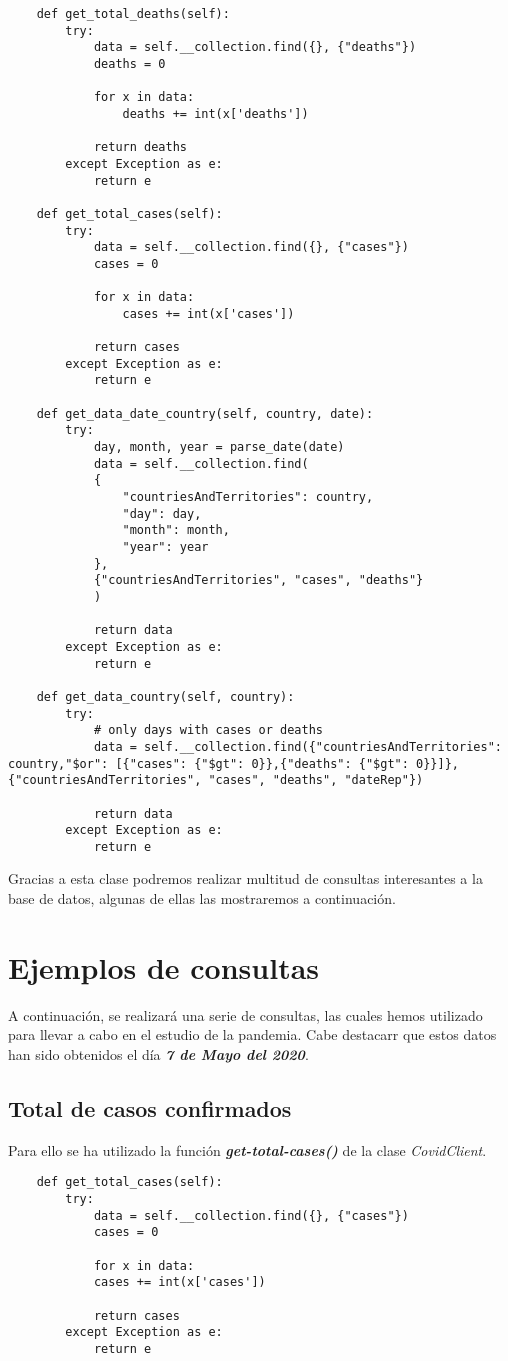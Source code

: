 \documentclass[11pt]{diazessay} %
\begin{document}
\begin{lstlisting}
	def get_total_deaths(self):
		try:
			data = self.__collection.find({}, {"deaths"})
			deaths = 0
			
			for x in data:
				deaths += int(x['deaths'])
			
			return deaths
		except Exception as e:
			return e
	
	def get_total_cases(self):
		try:
			data = self.__collection.find({}, {"cases"})
			cases = 0
			
			for x in data:
				cases += int(x['cases'])
			
			return cases
		except Exception as e:
			return e
	
	def get_data_date_country(self, country, date):
		try:
			day, month, year = parse_date(date)
			data = self.__collection.find(
			{
				"countriesAndTerritories": country,
				"day": day,
				"month": month,
				"year": year
			},
			{"countriesAndTerritories", "cases", "deaths"}
			)
		
			return data
		except Exception as e:
			return e
	
	def get_data_country(self, country):
		try:
			# only days with cases or deaths
			data = self.__collection.find({"countriesAndTerritories": country,"$or": [{"cases": {"$gt": 0}},{"deaths": {"$gt": 0}}]},{"countriesAndTerritories", "cases", "deaths", "dateRep"})
			
			return data
		except Exception as e:
			return e
\end{lstlisting}

Gracias a esta clase podremos realizar multitud de consultas interesantes a la base de datos, algunas de ellas las mostraremos a continuación.

\newpage
\section*{Ejemplos de consultas}
A continuación, se realizará una serie de consultas, las cuales hemos utilizado para llevar a cabo en el estudio de la pandemia. Cabe destacarr que estos datos han sido obtenidos el día \textit{\textbf{7 de Mayo del 2020}}.\\

\subsection*{Total de casos confirmados}
Para ello se ha utilizado la función \textit{\textbf{get-total-cases()}} \cite{jupyter} de la clase \textit{CovidClient}.

\lstset{language=Python}
\begin{lstlisting}
	def get_total_cases(self):
		try:
			data = self.__collection.find({}, {"cases"})
			cases = 0
			
			for x in data:
			cases += int(x['cases'])
			
			return cases
		except Exception as e:
			return e
\end{lstlisting}
\end{document}
